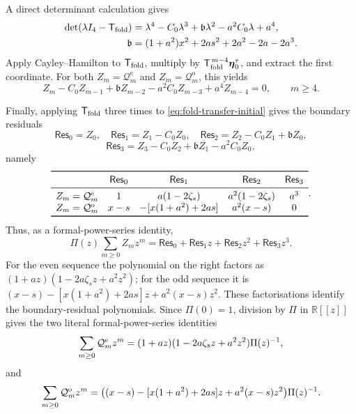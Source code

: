 \documentclass[12pt,anonymous]{iopjournal}
\numberwithin{equation}{section}
\theoremstyle{remark}
\begin{document}
A direct determinant calculation gives
\begin{equation}\label{eq:fold-transfer-characteristic}
\begin{aligned}
 \det(\lambda I_4-\mathsf T_{\rm fold})
 &=
 \lambda^4-C_0\lambda^3+\mathfrak b\lambda^2
 -a^2C_0\lambda+a^4,\\
 \mathfrak b
 &=(1+a^2)x^2+2as^2+2a^2-2a-2a^3.
\end{aligned}
\end{equation}
Apply Cayley--Hamilton to \(\mathsf T_{\rm fold}\), multiply by
\(\mathsf T_{\rm fold}^{\,m-4}\boldsymbol\eta_0^\tau\), and extract the
first coordinate.  For both \(Z_m=\mathcal Q_m^{\mathrm e}\) and
\(Z_m=\mathcal Q_m^{\mathrm o}\), this yields
\begin{equation}\label{eq:fold-recurrence}
 Z_m-C_0Z_{m-1}+\mathfrak bZ_{m-2}
 -a^2C_0Z_{m-3}+a^4Z_{m-4}=0,
 \qquad m\geq4.
\end{equation}

Finally, applying \(\mathsf T_{\rm fold}\) three times to
\eqref{eq:fold-transfer-initial} gives the boundary residuals
\[
 \mathsf{Res}_0=Z_0,\quad
 \mathsf{Res}_1=Z_1-C_0Z_0,\quad
 \mathsf{Res}_2=Z_2-C_0Z_1+\mathfrak bZ_0,
\]
\[
 \mathsf{Res}_3
 =Z_3-C_0Z_2+\mathfrak bZ_1-a^2C_0Z_0,
\]
namely
\[
\begin{array}{ccccc}
 \toprule
 &\mathsf{Res}_0&\mathsf{Res}_1&\mathsf{Res}_2&\mathsf{Res}_3\\ \midrule
 Z_m=\mathcal Q_m^{\rm e}
 &1&a(1-2\zeta_s)&a^2(1-2\zeta_s)&a^3\\
 Z_m=\mathcal Q_m^{\rm o}
 &x-s&-[x(1+a^2)+2as]&a^2(x-s)&0\\
 \bottomrule
\end{array}.
\]
Thus, as a formal-power-series identity,
\[
 \Pi(z)\sum_{m\geq0}Z_mz^m
 =\mathsf{Res}_0+\mathsf{Res}_1z+\mathsf{Res}_2z^2+\mathsf{Res}_3z^3.
\]
For the even sequence the polynomial on the right factors as
\((1+az)(1-2a\zeta_sz+a^2z^2)\); for the odd sequence it is
\((x-s)-[x(1+a^2)+2as]z+a^2(x-s)z^2\).  These factorisations identify the
boundary-residual polynomials.  Since \(\Pi(0)=1\), division by \(\Pi\) in
\(\mathbb R[[z]]\) gives the two literal formal-power-series identities
\begin{equation}\label{eq:fold-generating-even}
 \sum_{m\geq0}\mathcal Q_m^{\rm e}z^m
 =(1+az)(1-2a\zeta_sz+a^2z^2)\Pi(z)^{-1},
\end{equation}
and
\begin{equation}\label{eq:fold-generating-odd}
 \sum_{m\geq0}\mathcal Q_m^{\rm o}z^m
 =\bigl((x-s)-[x(1+a^2)+2as]z+a^2(x-s)z^2\bigr)
  \Pi(z)^{-1}.
\end{equation}
\end{document}
